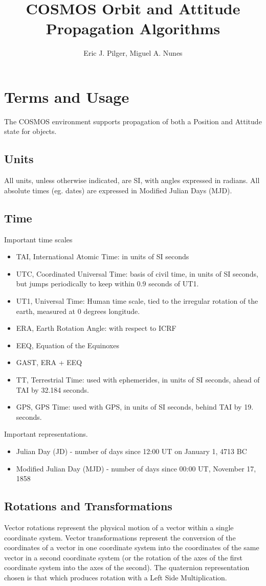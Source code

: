 \documentclass[12pt,letterpaper]{paper}
\title{COSMOS Orbit and Attitude Propagation Algorithms}
\author{Eric J. Pilger, Miguel A. Nunes}
\begin{document}
\maketitle
\tableofcontents

\section{Terms and Usage}
The COSMOS environment supports propagation of both a Position and Attitude state for objects. 
\subsection{Units}
All units, unless otherwise indicated, are SI, with angles expressed in radians. All absolute times (eg. dates) are expressed in Modified Julian Days (MJD).
\subsection{Time}
Important time scales
\begin{itemize}
\item TAI, International Atomic Time: in units of SI seconds
\item UTC, Coordinated Universal Time: basis of civil time, in units of SI seconds, but jumps periodically to keep within 0.9 seconds of UT1.
\item UT1, Universal Time: Human time scale, tied to the irregular rotation of the earth, measured at 0 degrees longitude.
\item ERA, Earth Rotation Angle: with respect to ICRF
\item EEQ, Equation of the Equinoxes
\item GAST, ERA + EEQ
\item TT, Terrestrial Time: used with ephemerides, in units of SI seconds, ahead of TAI by 32.184 seconds.
\item GPS, GPS Time: used with GPS, in units of SI seconds, behind TAI by 19. seconds.
\end{itemize}
Important representations.
\begin{itemize}
\item Julian Day (JD) - number of days since 12:00 UT on January 1, 4713 BC
\item Modified Julian Day (MJD) - number of days since 00:00 UT, November 17, 1858
\end{itemize}
\subsection{Rotations and Transformations}
Vector rotations represent the physical motion of a vector within a single coordinate system. Vector transformations represent the conversion of the coordinates of a vector in one coordinate system into the coordinates of the same vector in a second coordinate system (or the rotation of the axes of the first coordinate system into the axes of the second). The quaternion representation chosen is that which produces rotation with a Left Side Multiplication.
\end{document}
